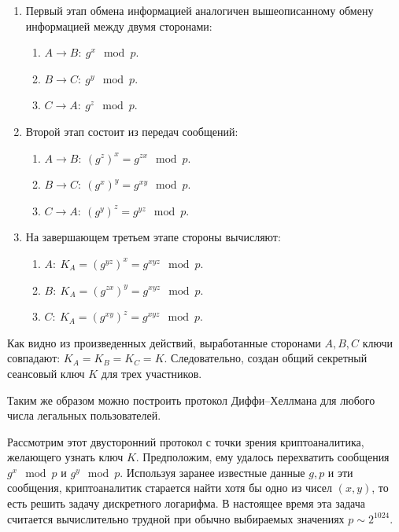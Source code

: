 \begin{enumerate}
    \item Первый этап обмена информацией аналогичен вышеописанному обмену информацией между двумя сторонами:
        \begin{enumerate}
            \item $A \rightarrow B: ~ g^x \mod p$.
            \item $B \rightarrow C: ~ g^y \mod p$.
            \item $C \rightarrow A: ~ g^z \mod p$.
        \end{enumerate}
    \item Второй этап состоит из передач сообщений:
        \begin{enumerate}
            \item $A \rightarrow B: ~ (g^z)^x = g^{zx} \mod p$.
            \item $B \rightarrow C: ~ (g^x)^y = g^{xy} \mod p$.
            \item $C \rightarrow A: ~ (g^y)^z = g^{yz} \mod p$.
        \end{enumerate}
    \item На завершающем третьем этапе стороны вычисляют:
        \begin{enumerate}
            \item $A: ~ K_A = (g^{yz})^x = g^{xyz} \mod p$.
            \item $B: ~ K_A = (g^{zx})^y = g^{xyz} \mod p$.
            \item $C: ~ K_A = (g^{xy})^z = g^{xyz} \mod p$.
        \end{enumerate}
\end{enumerate}

Как видно из произведенных действий, выработанные сторонами $A, B, C$ ключи совпадают: $K_A = K_B = K_C = K$. Следовательно, создан общий секретный сеансовый ключ $K$ для трех участников.

Таким же образом можно построить протокол Диффи--Хеллмана для любого числа легальных пользователей.

Рассмотрим этот двусторонний протокол с точки зрения криптоаналитика, желающего узнать ключ $K$. Предположим, ему удалось перехватить сообщения $g^{x}\mod p$ и $g^{y}\mod p $. Используя заранее известные данные $g,p $ и эти сообщения, криптоаналитик старается найти  хотя бы одно из чисел $(x,y)$, то есть решить задачу дискретного логарифма. В настоящее время эта задача  считается вычислительно трудной при обычно выбираемых значениях $p\sim 2^{1024}$.

